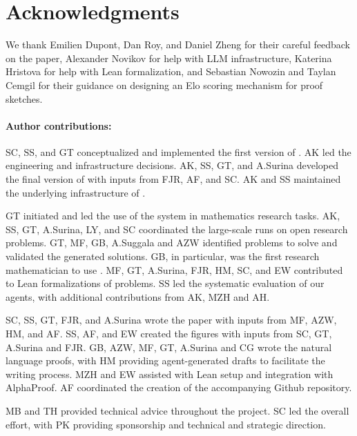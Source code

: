 





\section*{Acknowledgments}

We thank Emilien Dupont, Dan Roy, and Daniel Zheng for their careful feedback on the paper, Alexander Novikov for help with LLM infrastructure, Katerina Hristova for help with Lean formalization, and Sebastian Nowozin and Taylan Cemgil for their guidance on designing an Elo scoring mechanism for proof sketches.

\paragraph*{Author contributions:}
SC, SS, and GT conceptualized and implemented the first version of {\systemlong}. AK led the engineering and infrastructure decisions. AK, SS, GT, and A.Surina developed the final version of {\systemlong} with inputs from FJR, AF, and SC. AK and SS maintained the underlying infrastructure of \systemlong. 

GT initiated and led the use of the system in mathematics research tasks. AK, SS, GT, A.Surina, LY, and SC coordinated the large-scale runs on open research problems. GT, MF, GB, A.Suggala and AZW identified problems to solve and validated the generated solutions. GB, in particular, was the first research mathematician to use {\systemlong}. MF, GT, A.Surina, FJR, HM, SC, and EW contributed to Lean formalizations of problems. SS led the systematic evaluation of our agents, with additional contributions from AK, MZH and AH. 

SC, SS, GT, FJR, and A.Surina wrote the paper with inputs from MF, AZW, HM, and AF. SS, AF, and EW created the figures with inputs from SC, GT, A.Surina and FJR. GB, AZW, MF, GT, A.Surina and CG wrote the natural language proofs, with HM providing agent-generated drafts to facilitate the writing process.  MZH and EW assisted with Lean setup and integration with AlphaProof. AF coordinated the creation of the accompanying Github repository. 

MB and TH provided technical advice throughout the project. SC led the overall effort, with PK providing sponsorship and technical and strategic direction. 

